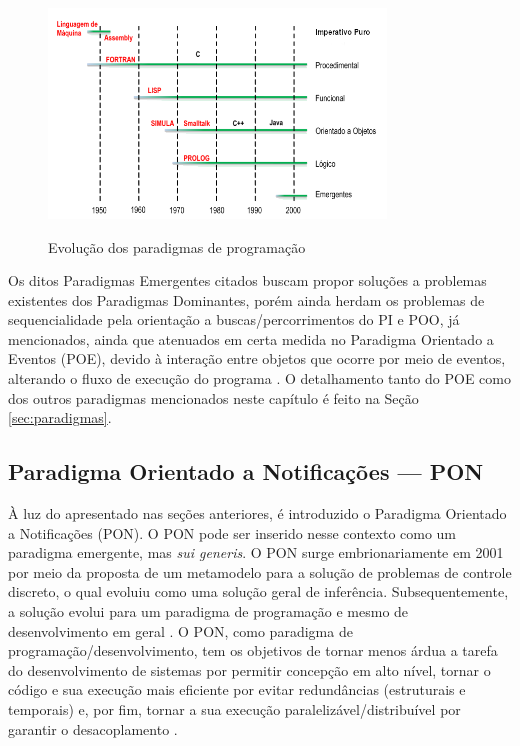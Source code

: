 \begin{figure}[!htb]
  \centering
  \caption{Evolução dos paradigmas de programação}
  \includegraphics[width=0.8\textwidth]{../figures/evolucao.png}
  \label{fig:evolucao}
\end{figure}

Os ditos Paradigmas Emergentes citados buscam propor soluções a problemas
existentes dos Paradigmas Dominantes, porém ainda herdam os problemas de
sequencialidade pela orientação a buscas/percorrimentos do PI e POO, já
mencionados, ainda que atenuados em certa medida no Paradigma Orientado a
Eventos (POE), devido à interação entre objetos que ocorre por meio de eventos,
alterando o fluxo de execução do programa \cite{ferg_2006}. O detalhamento tanto
do POE como dos outros paradigmas mencionados neste capítulo é feito na Seção
\ref{sec:paradigmas}.

\subsection{Paradigma Orientado a Notificações — PON}\label{sec:pon}

À luz do apresentado nas seções anteriores, é introduzido o Paradigma Orientado
a Notificações (PON). O PON pode ser inserido nesse contexto como um paradigma
emergente, mas \textit{sui generis}. O PON surge embrionariamente em 2001 por
meio da proposta de um metamodelo para a solução de problemas de controle
discreto, o qual evoluiu como uma solução geral de inferência. Subsequentemente,
a solução evolui para um paradigma de programação e mesmo de desenvolvimento em
geral
\cite{simao_livro_2002,doc_simao_2005,pat_simao_2008,simao_2009,doc_ronszcka_2019}.
O PON, como paradigma de programação/desenvolvimento, tem os objetivos de tornar
menos árdua a tarefa do desenvolvimento de sistemas por permitir concepção em
alto nível, tornar o código e sua execução mais eficiente por evitar
redundâncias (estruturais e temporais) e, por fim, tornar a sua execução
paralelizável/distribuível por garantir o desacoplamento \cite{simao_2009}.

